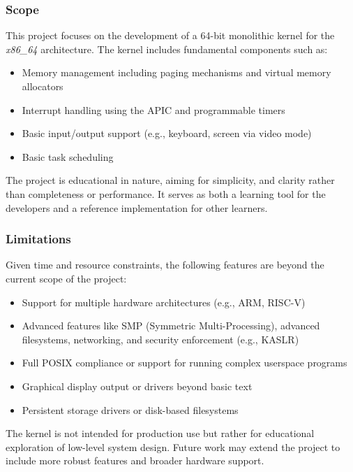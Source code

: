 \documentclass[12pt]{extarticle}
\begin{document}
\subsubsection*{Scope}
This project focuses on the development of a 64-bit monolithic kernel for the
\textit{x86\_64} architecture. The kernel includes fundamental components
such as:

\begin{itemize}
    \item Memory management including paging mechanisms and virtual memory allocators
    \item Interrupt handling using the APIC and programmable timers
    \item Basic input/output support (e.g., keyboard, screen via video mode)
    \item Basic task scheduling
\end{itemize}

The project is educational in nature, aiming for simplicity, and clarity rather
than completeness or performance. It serves as both a learning tool for the
developers and a reference implementation for other learners.

\subsubsection*{Limitations}
Given time and resource constraints, the following features are beyond the
current scope of the project:

\begin{itemize}
    \item Support for multiple hardware architectures (e.g., ARM, RISC-V)
    \item Advanced features like SMP (Symmetric Multi-Processing), advanced filesystems, networking, and security enforcement (e.g., KASLR)
    \item Full POSIX compliance or support for running complex userspace
    programs
    \item Graphical display output or drivers beyond basic text
    \item Persistent storage drivers or disk-based filesystems
\end{itemize}

The kernel is not intended for production use but rather for educational
exploration of low-level system design. Future work may extend the project to
include more robust features and broader hardware support.

\pagebreak
\end{document}
